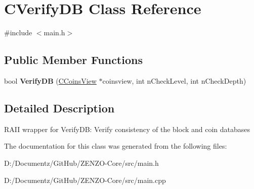 \hypertarget{class_c_verify_d_b}{}\section{C\+Verify\+DB Class Reference}
\label{class_c_verify_d_b}


{\ttfamily \#include $<$main.\+h$>$}

\subsection*{Public Member Functions}
\begin{DoxyCompactItemize}
\item 
\mbox{\label{class_c_verify_d_b_a5d3e3ade35a14ddce2404e18e4b1df50}} 
bool {\bfseries Verify\+DB} (\mbox{\hyperlink{class_c_coins_view}{C\+Coins\+View}} $\ast$coinsview, int n\+Check\+Level, int n\+Check\+Depth)
\end{DoxyCompactItemize}


\subsection{Detailed Description}
R\+A\+II wrapper for Verify\+DB\+: Verify consistency of the block and coin databases 

The documentation for this class was generated from the following files\+:\begin{DoxyCompactItemize}
\item 
D\+:/\+Documentz/\+Git\+Hub/\+Z\+E\+N\+Z\+O-\/\+Core/src/main.\+h\item 
D\+:/\+Documentz/\+Git\+Hub/\+Z\+E\+N\+Z\+O-\/\+Core/src/main.\+cpp\end{DoxyCompactItemize}
